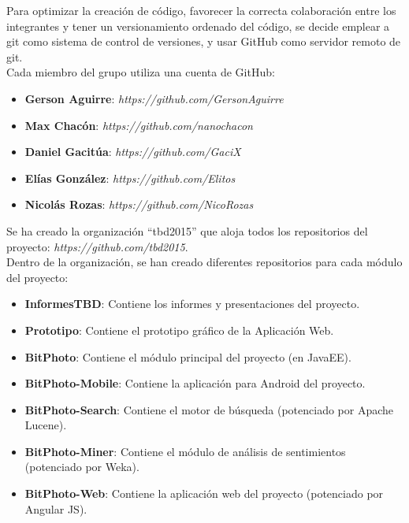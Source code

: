 \documentclass{memoria}
\begin{document}
    
Para optimizar la creación de código, favorecer la correcta colaboración entre los integrantes y tener un versionamiento ordenado del código, se decide emplear a git como sistema de control de versiones, y usar GitHub como servidor remoto de git.\\

Cada miembro del grupo utiliza una cuenta de GitHub:

\begin{itemize}
	\item \textbf{Gerson Aguirre}: \textsl{https://github.com/GersonAguirre}
	\item \textbf{Max Chacón}: \textsl{https://github.com/nanochacon}
	\item \textbf{Daniel Gacitúa}: \textsl{https://github.com/GaciX}
	\item \textbf{Elías González}: \textsl{https://github.com/Elitos}
	\item \textbf{Nicolás Rozas}: \textsl{https://github.com/NicoRozas}
\end{itemize}

Se ha creado la organización “tbd2015” que aloja todos los repositorios del proyecto: \textsl{https://github.com/tbd2015}.\\

Dentro de la organización, se han creado diferentes repositorios para cada módulo del proyecto:

\begin{itemize}
	\item \textbf{InformesTBD}: Contiene los informes y presentaciones del proyecto. 
	\item \textbf{Prototipo}: Contiene el prototipo gráfico de la Aplicación Web.
	\item \textbf{BitPhoto}: Contiene el módulo principal del proyecto (en JavaEE).
	\item \textbf{BitPhoto-Mobile}: Contiene la aplicación para Android del proyecto.
	\item \textbf{BitPhoto-Search}: Contiene el motor de búsqueda (potenciado por Apache Lucene).
	\item \textbf{BitPhoto-Miner}: Contiene el módulo de análisis de sentimientos (potenciado por Weka).
	\item \textbf{BitPhoto-Web}: Contiene la aplicación web del proyecto (potenciado por Angular JS).
\end{itemize}
\end{document}
